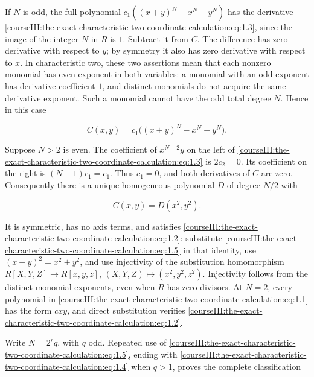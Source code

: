 If \(N\) is odd, the full polynomial
\(c_1((x+y)^N-x^N-y^N)\) has the derivative \eqref{courseIII:the-exact-characteristic-two-coordinate-calculation:eq:1.3}, since the image of the integer \(N\) in \(R\) is \(1\). Subtract it from \(C\). The difference has zero derivative with respect to \(y\); by symmetry it also has zero derivative with respect to \(x\). In characteristic two, these two assertions mean that each nonzero monomial has even exponent in both variables: a monomial with an odd exponent has derivative coefficient \(1\), and distinct monomials do not acquire the same derivative exponent. Such a monomial cannot have the odd total degree \(N\). Hence in this case

\begin{equation}
C(x,y)=c_1\bigl((x+y)^N-x^N-y^N\bigr).
 \label{courseIII:the-exact-characteristic-two-coordinate-calculation:eq:1.4}
\end{equation}

Suppose \(N>2\) is even. The coefficient of \(x^{N-2}y\) on the left of \eqref{courseIII:the-exact-characteristic-two-coordinate-calculation:eq:1.3} is \(2c_2=0\). Its coefficient on the right is \((N-1)c_1=c_1\). Thus \(c_1=0\), and both derivatives of \(C\) are zero. Consequently there is a unique homogeneous polynomial \(D\) of degree \(N/2\) with

\begin{equation}
C(x,y)=D(x^2,y^2).
 \label{courseIII:the-exact-characteristic-two-coordinate-calculation:eq:1.5}
\end{equation}

It is symmetric, has no axis terms, and satisfies \eqref{courseIII:the-exact-characteristic-two-coordinate-calculation:eq:1.2}: substitute \eqref{courseIII:the-exact-characteristic-two-coordinate-calculation:eq:1.5} in that identity, use \((x+y)^2=x^2+y^2\), and use injectivity of the substitution homomorphism \(R[X,Y,Z]\to R[x,y,z]\), \((X,Y,Z)\mapsto(x^2,y^2,z^2)\). Injectivity follows from the distinct monomial exponents, even when \(R\) has zero divisors. At \(N=2\), every polynomial in \eqref{courseIII:the-exact-characteristic-two-coordinate-calculation:eq:1.1} has the form \(cxy\), and direct substitution verifies \eqref{courseIII:the-exact-characteristic-two-coordinate-calculation:eq:1.2}.

Write \(N=2^r q\), with \(q\) odd. Repeated use of \eqref{courseIII:the-exact-characteristic-two-coordinate-calculation:eq:1.5}, ending with \eqref{courseIII:the-exact-characteristic-two-coordinate-calculation:eq:1.4} when \(q>1\), proves the complete classification

